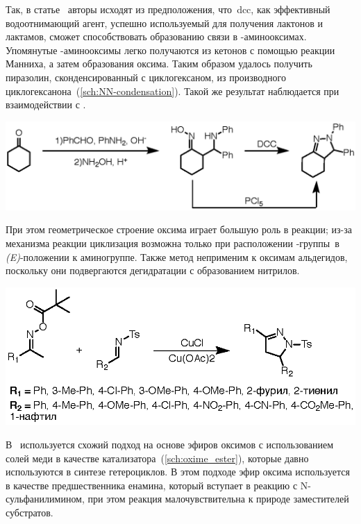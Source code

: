 Так, в статье~\cite{Hassner1962a} авторы исходят из предположения, что~\ac{dcc}, как эффективный водоотнимающий агент, успешно используемый для получения лактонов и лактамов, сможет способствовать образованию связи  в \chembeta-аминооксимах.
Упомянутые \chembeta-аминооксимы легко получаются из кетонов с помощью реакции Манниха, а затем образования оксима.
Таким образом удалось получить пиразолин, сконденсированный с циклогексаном, из производного циклогексанона~(\ref{sch:NN-condensation}).
Такой же результат наблюдается при взаимодействии с .

\begin{scheme}[h!]
    \centering
    \includegraphics{sections/literature/img/NN-condensation.eps}
    \caption{}
    \label{sch:NN-condensation}
\end{scheme}

При этом геометрическое строение оксима играет большую роль в реакции; из-за механизма реакции циклизация возможна только при расположении \mbox{-группы }в \mbox{\emph{(E)}-положении} к аминогруппе.
Также метод неприменим к оксимам альдегидов, поскольку они подвергаются дегидратации с образованием нитрилов.

\begin{scheme}[h!]
    \centering
    \includegraphics{sections/literature/img/oxime_ester.eps}
    \caption{}
    \label{sch:oxime_ester}
\end{scheme}

В~\cite{Wu2014d} используется схожий подход на основе эфиров оксимов с использованием солей меди в качестве катализатора~(\ref{sch:oxime_ester}), которые давно используются в синтезе гетероциклов.
В этом подходе эфир оксима используется в качестве предшественника енамина, который вступает в реакцию с N-сульфанилимином, при этом реакция малочувствительна к природе заместителей субстратов.

